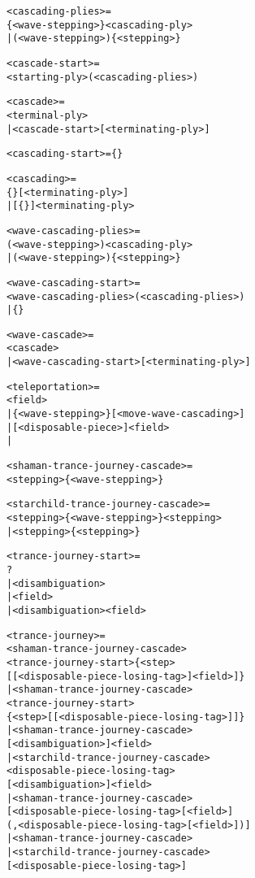 \begin{alltt}
<cascading-plies> =
  \{<wave-stepping>\}\alg{~}<cascading-ply>
| (<wave-stepping>)\{<stepping>\}

<cascade-start> =
  <starting-ply>(<cascading-plies>)

<cascade> =
  <terminal-ply>
| <cascade-start>[\alg{~}<terminating-ply>]

<cascading-start> = \{<cascading-plies>\}

<cascading> =
  \{<cascading-plies>\}[\alg{~}<terminating-ply>]
| [\{<cascading-plies>\}\alg{~}]<terminating-ply>

<wave-cascading-plies> =
  (<wave-stepping>)\alg{~}<cascading-ply>
| (<wave-stepping>)\{<stepping>\}

<wave-cascading-start> =
  <wave-cascading-plies>(<cascading-plies>)
| \{<cascading-plies>\}

<wave-cascade> =
  \alg{~}<cascade>
| <wave-cascading-start>[\alg{~}<terminating-ply>]

<teleportation> =
  \alg{|}<field>
| \{<wave-stepping>\}[<move-wave-cascading>]
| \alg{||}[<disposable-piece>]<field>
| \alg{||}
\end{alltt}

\clearpage %

\begin{alltt}
<shaman-trance-journey-cascade> =
  <stepping>\{<wave-stepping>\}

<starchild-trance-journey-cascade> =
  <stepping>\{<wave-stepping>\}<stepping>
| <stepping>\{<stepping>\}

<trance-journey-start> =
  ?
| <disambiguation>
| \alg{,}<field>
| <disambiguation>\alg{,}<field>

<trance-journey> =
  <shaman-trance-journey-cascade>
    <trance-journey-start>\{<step>
    [\alg{<}[<disposable-piece-losing-tag>]<field>]\}
| <shaman-trance-journey-cascade>
    <trance-journey-start>
    \{<step>[\alg{*}[<disposable-piece-losing-tag>]]\}
| <shaman-trance-journey-cascade>
    [<disambiguation>]<field>
| <starchild-trance-journey-cascade>
    <disposable-piece-losing-tag>
    [<disambiguation>]<field>
| <shaman-trance-journey-cascade>
    [<disposable-piece-losing-tag>[<field>]
    (,<disposable-piece-losing-tag>[<field>])]
| <shaman-trance-journey-cascade>
| <starchild-trance-journey-cascade>
    [<disposable-piece-losing-tag>]
\end{alltt}

